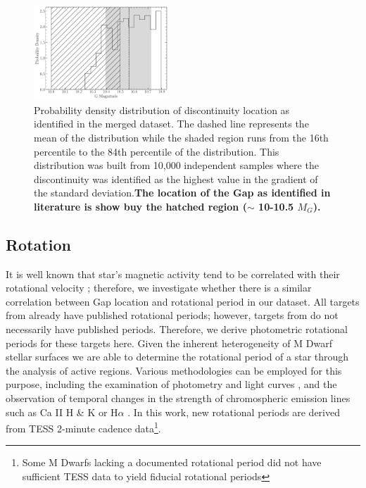 \begin{figure}
  \centering
  \includegraphics[width=0.45\textwidth]{figures/GapLocationMC.pdf}
  \caption{Probability density distribution of discontinuity location as
  identified in the merged dataset. The dashed line represents the mean of the
  distribution while the shaded region runs from the 16th percentile to the
  84th percentile of the distribution. This distribution was built from 10,000
  independent samples where the discontinuity was identified as the highest
  value in the gradient of the standard deviation.\textbf{The location of the Gap
  as identified in literature is show buy the hatched region ($\sim$ 10-10.5 $M_{G}$).}}
  \label{fig:GapLocationMC}
\end{figure}

\subsection{Rotation}
It is well known that star's magnetic activity tend to be correlated with their
rotational velocity \citep{Vaughan1981, Newton2016, Astudillo-Defru2017,
Houdebine2017, Boudreaux2022}; therefore, we investigate whether there is a
similar correlation between Gap location and rotational period in our dataset.
All targets from \citet{Boudreaux2022} already have published rotational
periods; however, targets from \citet{Perdelwitz2021} do not necessarily have
published periods. Therefore, we derive photometric rotational periods for
these targets here. Given the inherent heterogeneity of M Dwarf stellar
surfaces \citep{Boisse2011, Robertson2020} we are able to determine the
rotational period of a star through the analysis of active regions. Various
methodologies can be employed for this purpose, including the examination of
photometry and light curves \citep[e.g.,][]{Newton2016}, and the observation of
temporal changes in the strength of chromospheric emission lines such as Ca II
H \& K or H$\alpha$ \citep[e.g.,][]{2019A&A...623A..24F,2023MNRAS.518.3147K}.
In this work, new rotational periods are derived from TESS 2-minute cadence
data\footnote{Some M Dwarfs lacking a documented rotational period did not have
sufficient TESS data to yield fiducial rotational periods}.

